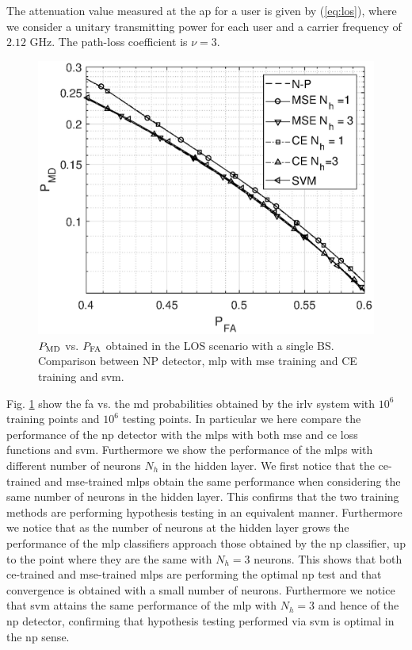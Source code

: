 \documentclass[draftcls,onecolumn,12pt]{IEEEtran}
\begin{document}
The attenuation value measured at the \ac{ap} for a user is given by (\ref{eq:los}), where we consider a unitary transmitting power for each user and a carrier frequency of $2.12$ GHz. The path-loss coefficient is $\nu=3$. 
\begin{figure}[h]
    \centering
    \includegraphics[width=0.5\columnwidth]{res_com_CE_MSE_SVM.eps}
    \caption{$P_{\rm MD}$ vs. $P_{\rm FA}$ obtained in the LOS scenario with a single BS. Comparison between NP detector, \ac{mlp} with \ac{mse} training and CE training and \ac{svm}.}
    \label{fig:ceVSmse}
\end{figure}

Fig. \ref{fig:ceVSmse} show the \ac{fa} vs. the \ac{md} probabilities obtained by the \ac{irlv} system with $10^6$ training points and $10^6$ testing points. In particular we here compare the performance of the \ac{np} detector with the \acp{mlp} with both \ac{mse} and \ac{ce} loss functions and \ac{svm}. Furthermore we show the performance of the \acp{mlp} with different number of neurons $N_h$ in the hidden layer. We first notice that the \ac{ce}-trained and \ac{mse}-trained \acp{mlp} obtain the same performance when considering the same number of neurons in the hidden layer. This confirms that the two training methods are performing hypothesis testing in an equivalent manner. Furthermore we notice that as the number of neurons at the hidden layer grows the performance of the \ac{mlp} classifiers approach those obtained by the \ac{np} classifier, up to the point where they are the same with $N_h=3$ neurons. This shows that both \ac{ce}-trained and \ac{mse}-trained \acp{mlp} are performing the optimal \ac{np} test and that convergence is obtained with a small number of neurons. Furthermore we notice that \ac{svm} attains the same performance of the \ac{mlp} with $N_h = 3$ and hence of the \ac{np} detector, confirming that hypothesis testing performed via \ac{svm} is optimal in the \ac{np} sense.
\end{document}
